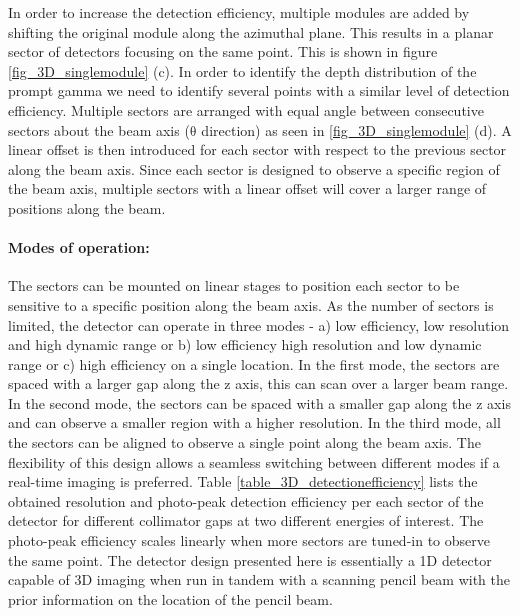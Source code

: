 \documentclass[11pt,a4paper]{article}
\begin{document}
%

In order to increase the detection efficiency, multiple modules are added by shifting the original module along the azimuthal plane. This results in a planar sector of detectors focusing on the same point. This is shown in figure \ref{fig_3D_singlemodule} (c). In order to identify the depth distribution of the prompt gamma we need to identify several points with a similar level of detection efficiency. 
Multiple sectors are arranged with equal angle between consecutive sectors about the beam axis ($\mathrm{\theta}$ direction) as seen in  \ref{fig_3D_singlemodule} (d). A linear offset is then introduced for each sector with respect to the previous sector along the beam axis. Since each sector is designed to observe a specific region of the beam axis, multiple sectors with a linear offset will cover a larger range of positions along the beam.


\paragraph{Modes of operation:}
The sectors can be mounted on linear stages to position each sector to be sensitive to a specific position along the beam axis. As the number of sectors is limited, the detector can operate in three modes - a)  low efficiency, low resolution and high dynamic range or b) low efficiency high resolution and low dynamic range or c) high efficiency on a single location. 
In the first mode, the sectors are spaced with a larger gap along the z axis, this can scan over a larger beam range. In the second mode,  the sectors can be spaced with a smaller gap along the z axis and can observe a smaller region with a higher resolution.
In the third mode, all the sectors can be aligned to observe a single point along the beam axis. The flexibility of this design allows a seamless switching between different modes if a real-time imaging is preferred. 
Table  \ref{table_3D_detectionefficiency} lists the obtained resolution and photo-peak detection efficiency per each sector of the detector for different collimator gaps at two different energies of interest. The photo-peak efficiency scales linearly when more sectors are tuned-in to observe the same point. 
The detector design presented here is essentially a 1D detector capable of 3D imaging when run in tandem with a scanning pencil beam with the prior information on the location of the pencil beam.
\end{document}
